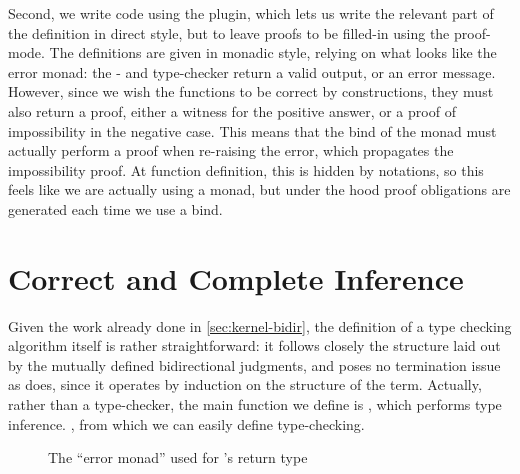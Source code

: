 Second, we write code using the  plugin, which lets us write the
relevant part of the definition in direct style, but to leave proofs to be filled-in using the
proof-mode. The definitions are given in monadic style, relying on what looks like the error monad:%
the - and type-checker return a valid output, or an error message. However, since
we wish the functions to be correct by constructions, they must also return a proof, either a
witness for the positive answer, or a proof of impossibility in the negative case.
This means that the bind of the monad must actually perform a proof when re-raising the error,
which propagates the impossibility proof.%
At function definition, this is hidden by notations, so this feels like we are actually using a
monad, but under the hood proof obligations are generated each time we use a bind.

\section{Correct and Complete Inference}
\label{sec:kernel-typing}

Given the work already done in \cref{sec:kernel-bidir}, the definition of a
type checking algorithm 
itself is rather straightforward: it follows closely
the structure laid out by the mutually defined bidirectional judgments, and
poses no termination issue as  does, since it
operates by induction on the structure of the term.
Actually, rather than a type-checker, the main function we define is
, which performs type inference.%
,
from which we can easily define type-checking.

\begin{figure}[h]
  \caption{The “error monad” used for ’s return type}
  \label{fig:meta-error-mon}
\end{figure}

